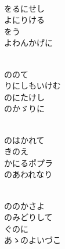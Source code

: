 \documentclass[10pt,b5j]{tarticle} %
\begin{document}
\vspace{1.5em} %
\newcommand{\linespace}{0.5em} %
\newcommand{\blocksize}{0.5\hsize} %
\newcommand{\itemmargin}{6em} %
\begin{enumerate} %
    \setlength{\itemindent}{\itemmargin} %
    \begin{minipage}[c]{\blocksize}
    
        \vspace{\linespace}
        \item~\\
        をるにせし\\
        よにりける\\
        をう\\
        よわんかげに
        
        \vspace{\linespace}
        \item~\\
        ののて\\
        りにしもいけむ\\
        のにたけし\\
        のかゞりに
        
        \vspace{\linespace}
        \item~\\
        のはかれて\\
        きのえ\\
        かにるポプラ\\
        のあわれなり
        
        \vspace{\linespace}
        \item~\\
        ののかさよ\\
        のみどりして\\
        ぐのに\\
        あゝのよいづこ
        

\end{minipage}
\end{enumerate}
\end{document}
